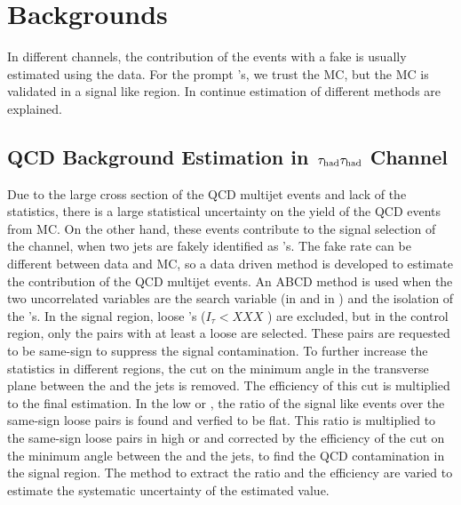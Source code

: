 \section{Backgrounds}
\label{sect:bkgLepTau}
In different channels, the contribution of the events with a fake \Tau is usually estimated using the data. For the prompt \Tau's, we trust 
the MC, but the MC is validated in a signal like region. In continue estimation of different methods are explained.

\subsection{\texorpdfstring{QCD Background Estimation in $\,\tau_{\rm had}\tau_{\rm had}$ Channel}{QCD Background Estimation in tau-tau Channel}}
Due to the large cross section of the QCD multijet events and lack of the statistics, there is a large statistical uncertainty on the 
yield of the QCD events from MC. On the other hand, these events contribute to the signal selection of the \tauTau channel, when two jets are 
fakely identified as \Tau's. The fake rate can be different between data and MC, so a data driven method is developed to estimate the 
contribution of the QCD multijet events. 
An ABCD method is used when the two uncorrelated variables are the search variable (\mttwo in \binone and \SumMT in \bintwo) and the 
isolation of the \Tau's. In the signal region, loose \Tau's ($I_\tau < XXX$ \GeV ) are excluded, but in the control region, only the pairs with at least a loose \Tau 
are selected. These pairs are requested to be same-sign to suppress the signal contamination. To further increase the statistics 
in different regions, the cut on the minimum angle in the transverse plane between the \MET and the jets is removed. The efficiency of this
cut is multiplied to the final estimation. In the low \mttwo or \SumMT, the ratio of the signal like events over the same-sign loose pairs 
is found and verfied to be flat. 
This ratio is multiplied to the same-sign loose pairs in high \mttwo or \SumMT and corrected by the efficiency of the 
cut on the minimum angle between the \MET and the jets, to find the QCD contamination in the signal region. The method to extract the
ratio and the efficiency are varied to estimate the systematic uncertainty of the estimated value.



